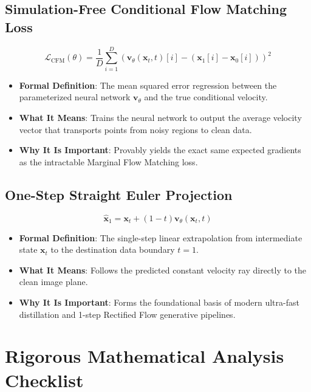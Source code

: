 \documentclass[11pt,a4paper]{article}
\theoremstyle{definition}
\begin{document}
\subsection{Simulation-Free Conditional Flow Matching Loss}
{\boldmath
\begin{equation}
\mathcal{L}_{\text{CFM}}(\theta) = \frac{1}{D} \sum_{i=1}^D \left( \mathbf{v}_\theta(\mathbf{x}_t, t)[i] - (\mathbf{x}_1[i] - \mathbf{x}_0[i]) \right)^2
\end{equation}
}
\begin{itemize}
    \item \textbf{Formal Definition}: The mean squared error regression between the parameterized neural network $\mathbf{v}_\theta$ and the true conditional velocity.
    \item \textbf{What It Means}: Trains the neural network to output the average velocity vector that transports points from noisy regions to clean data.
    \item \textbf{Why It Is Important}: Provably yields the exact same expected gradients as the intractable Marginal Flow Matching loss.
\end{itemize}

\subsection{One-Step Straight Euler Projection}
{\boldmath
\begin{equation}
\hat{\mathbf{x}}_1 = \mathbf{x}_t + (1 - t) \mathbf{v}_\theta(\mathbf{x}_t, t)
\end{equation}
}
\begin{itemize}
    \item \textbf{Formal Definition}: The single-step linear extrapolation from intermediate state $\mathbf{x}_t$ to the destination data boundary $t = 1$.
    \item \textbf{What It Means}: Follows the predicted constant velocity ray directly to the clean image plane.
    \item \textbf{Why It Is Important}: Forms the foundational basis of modern ultra-fast distillation and 1-step Rectified Flow generative pipelines.
\end{itemize}

\section{Rigorous Mathematical Analysis Checklist}
\end{document}
